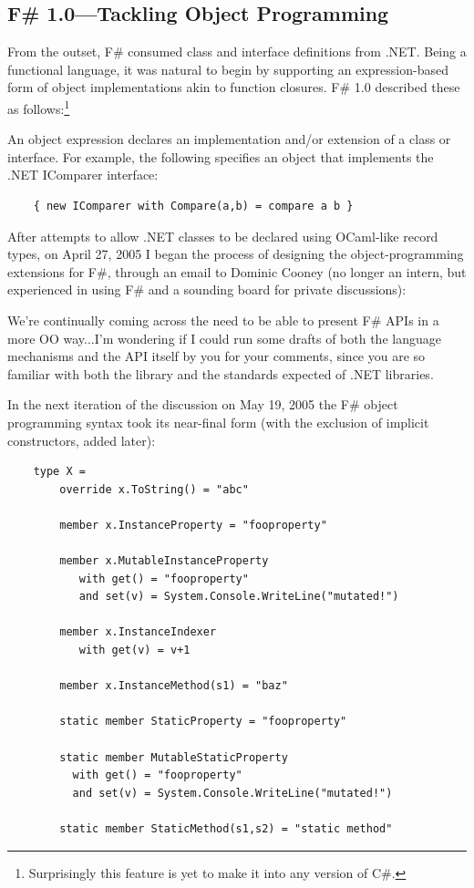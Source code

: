\documentclass[acmsmall,screen]{acmart}
\begin{document}
\subsection*{F\# 1.0---Tackling Object Programming}

From the outset, F\# consumed class and interface definitions from .NET. Being a functional language, it was
natural to begin by supporting an expression-based form of object implementations akin to function closures.  F\# 1.0 described these as follows:\footnote{Surprisingly this feature is yet to make it into any version of C\#.}
\begin{verbquote}
An object expression declares an implementation and/or extension of a class or interface. For example, the following specifies an object that implements the .NET IComparer interface:
\end{verbquote}
\begin{verbatim}
    { new IComparer with Compare(a,b) = compare a b }
\end{verbatim}
After attempts to allow .NET classes to be declared using OCaml-like record types, on April 27, 2005 I began the process of designing the object-programming extensions for F\#, through an email to Dominic Cooney (no longer an intern, but experienced in using F\# and a sounding board for private discussions):

\begin{verbquote}
We're continually coming across the need to be able to present F# APIs in a more OO way...I'm wondering if I could run some drafts of both the language mechanisms and the API itself by you for your comments, since you are so familiar with both the library and the standards expected of .NET libraries. 
\end{verbquote}
In the next iteration of the discussion on May 19, 2005 the F\# object programming syntax took its near-final form (with the exclusion of implicit constructors, added later):
\begin{verbatim}
    type X =
        override x.ToString() = "abc"

        member x.InstanceProperty = "fooproperty"

        member x.MutableInstanceProperty
           with get() = "fooproperty"
           and set(v) = System.Console.WriteLine("mutated!")
    
        member x.InstanceIndexer
           with get(v) = v+1
     
        member x.InstanceMethod(s1) = "baz"

        static member StaticProperty = "fooproperty"

        static member MutableStaticProperty
          with get() = "fooproperty"
          and set(v) = System.Console.WriteLine("mutated!")
    
        static member StaticMethod(s1,s2) = "static method"
\end{verbatim}
\end{document}
